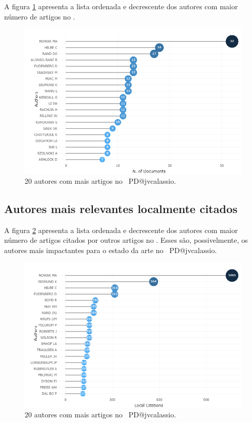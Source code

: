 A figura \ref{fig:PD@jvcalassio:Author:Production} apresenta a lista ordenada e decrescente dos autores com maior número de artigos no \dataset.

\begin{figure}
    \centering
    \includegraphics[width=1\textwidth]{exploratory-data-analysis/jvcalassio/PesqBibliogr/PrisonersDilemma/WoS-20221201/Dataset/MostRelevantAuthors-2022-12-03.png}
    \caption{20 autores com mais artigos no \dataset\ PD@jvcalassio.}
    \label{fig:PD@jvcalassio:Author:Production}
\end{figure}

\subsection{Autores mais relevantes localmente citados}

A figura \ref{fig:PD@jvcalassio:Author:LocalProduction} apresenta a lista ordenada e decrescente dos autores com maior número de artigos citados por outros artigos no \dataset. Esses são, possivelmente, os autores mais impactantes para o estado da arte no \dataset\ PD@jvcalassio.

\begin{figure}
    \centering
    \includegraphics[width=1\textwidth]{exploratory-data-analysis/jvcalassio/PesqBibliogr/PrisonersDilemma/WoS-20221201/Dataset/MostRelevantAuthorsLocal-2022-12-03.png}
    \caption{20 autores com mais artigos no \dataset\ PD@jvcalassio.}
    \label{fig:PD@jvcalassio:Author:LocalProduction}
\end{figure}

